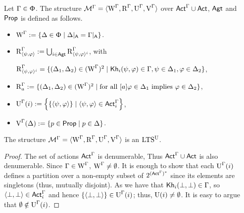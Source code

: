 \medskip

\begin{definition}\label{def:cm-ults-khiml}
Let $\Gamma \in \Upphi$. The structure $\mathcal{M}^\Gamma=\langle \operatorname{W}^\Gamma, \operatorname{R}^\Gamma, \operatorname{U}^\Gamma, \operatorname{V}^\Gamma \rangle$ over ${\rm \sf Act}^\Gamma \cup {\rm \sf Act}$, ${\rm \sf Agt}$ and ${\rm \sf Prop}$ is defined as follows.
\begin{itemize}
\item $\operatorname{W}^\Gamma := \{ \Delta \in \Upphi \mid \Delta\vert_{{\sf A}} = \Gamma\vert_{{\sf A}} \}$.

\item $\operatorname{R}^{\Gamma}_{\langle \psi,\varphi \rangle} := \bigcup_{i \in {\rm \sf Agt}} \operatorname{R}^{\Gamma} _{\langle \psi,\varphi \rangle^i}$, with
\begin{center}
$\operatorname{R}^{\Gamma}_{\langle \psi,\varphi \rangle^i} = \{ (\Delta_1, \Delta_2) \in (\operatorname{W}^\Gamma)^2 \mid {\sf Kh}_i(\psi,\varphi) \in \Gamma, \psi \in \Delta_1, \varphi \in \Delta_2 \}$,
\end{center}

\item $\operatorname{R}^{\Gamma}_a := \{ (\Delta_1, \Delta_2) \in (\operatorname{W}^\Gamma)^2 \mid \text{for all } [a]\varphi \in \Delta_1 \text{ implies } \varphi \in \Delta_2 \}$,

\item $\operatorname{U}^\Gamma(i) := \left\{ \{ \langle \psi,\varphi \rangle \} \mid \langle \psi,\varphi \rangle \in {\rm \sf Act}^\Gamma_i \right\}$,

\item $\operatorname{V}^\Gamma(\Delta) := \{ p \in {\rm \sf Prop} \mid p \in \Delta \}$.
\end{itemize}
\end{definition}

\medskip

\begin{proposition}\label{pro:cm-ults-khiml}
The structure $\mathcal{M}^\Gamma = \langle \operatorname{W}^\Gamma, \operatorname{R}^\Gamma, \operatorname{U}^\Gamma, \operatorname{V}^\Gamma \rangle$ is an $\textup{LTS$^\text{\textup{U}}$}$.
\end{proposition}
\begin{proof}
The set of actions ${\rm \sf Act}^\Gamma$ is denumerable, Thus ${\rm \sf Act}^\Gamma\cup{\rm \sf Act}$ is also denumerable.
Since $\Gamma \in \operatorname{W}^\Gamma$, $\operatorname{W}^\Gamma \neq \emptyset$.
It is enough to show that each $\operatorname{U}^\Gamma(i)$ defines a partition over a non-empty subset of $2^{({\rm \sf Act}^\Gamma)^*}$ since its elements are singletons (thus, mutually disjoint).
As we have that ${\sf Kh}_i(\bot,\bot) \in \Gamma$, so $\langle \bot, \bot \rangle \in {\rm \sf Act}^\Gamma_i$ and hence $\{ \langle \bot, \bot \rangle \} \in \operatorname{U}^\Gamma(i)$; thus, $\operatorname{U}(i) \neq \emptyset$.
It is easy to argue that $\emptyset \notin \operatorname{U}^\Gamma(i)$.
\end{proof}

